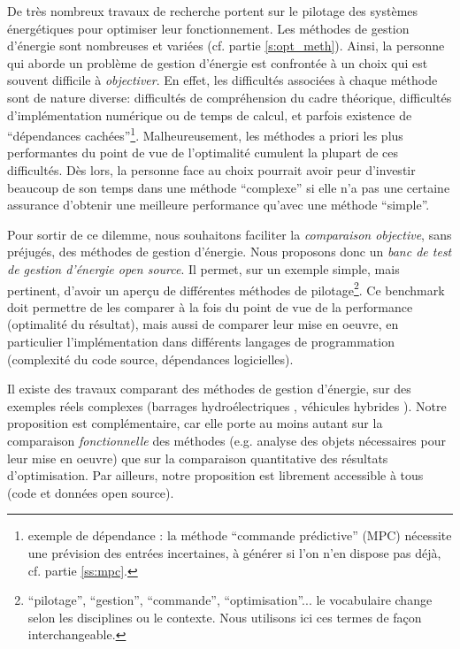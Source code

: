 \documentclass[a4paper,10pt,twocolumn]{article}
\begin{document}
De très nombreux travaux de recherche portent sur le pilotage des systèmes énergétiques
pour optimiser leur fonctionnement.
Les méthodes de gestion d'énergie sont nombreuses et variées (cf. partie \ref{s:opt_meth}).
Ainsi, la personne qui aborde un problème de gestion d'énergie
est confrontée à un choix qui est souvent difficile à \emph{objectiver}.
En effet, les difficultés associées à chaque méthode sont de nature diverse:
difficultés de compréhension du cadre théorique, difficultés d'implémentation
numérique ou de temps de calcul, et parfois existence de
``dépendances cachées''\footnote{
  exemple de dépendance : la méthode ``commande prédictive'' (MPC)
  nécessite une prévision des entrées incertaines,
  à générer si l'on n'en dispose pas déjà, cf. partie \ref{ss:mpc}.}.
Malheureusement, les méthodes a priori les plus performantes du point de vue de l'optimalité
cumulent la plupart de ces difficultés.
Dès lors, la personne face au choix pourrait avoir peur d'investir beaucoup de son temps
dans une méthode ``complexe'' si elle n'a pas une certaine assurance d'obtenir une meilleure
performance qu'avec une méthode ``simple''.

Pour sortir de ce dilemme, nous souhaitons faciliter la \emph{comparaison objective},
sans préjugés, des méthodes de gestion d'énergie.
Nous proposons donc un \emph{banc de test de gestion d'énergie open source}.
Il permet, sur un exemple simple, mais pertinent, d'avoir un aperçu de différentes méthodes
de pilotage\footnote{``pilotage'', ``gestion'', ``commande'', ``optimisation''...
le vocabulaire change selon les disciplines ou le contexte.
Nous utilisons ici ces termes de façon interchangeable.}.
Ce benchmark doit permettre de les comparer
à la fois du point de vue de la performance (optimalité du résultat),
mais aussi de comparer leur mise en oeuvre, en particulier l'implémentation
dans différents langages de programmation (complexité du code source, dépendances logicielles).

Il existe des travaux comparant des méthodes de gestion d'énergie, sur des exemples réels complexes
(barrages hydroélectriques \cite{Zambelli:2011:SBA}, véhicules hybrides \cite{Jiang:2017:ToVT}).
Notre proposition est complémentaire, car elle porte au moins autant sur la comparaison \emph{fonctionnelle}
des méthodes (e.g. analyse des objets nécessaires pour leur mise en oeuvre) que
sur la comparaison quantitative des résultats d'optimisation.
Par ailleurs, notre proposition est librement accessible à tous (code et données open source).
\end{document}
